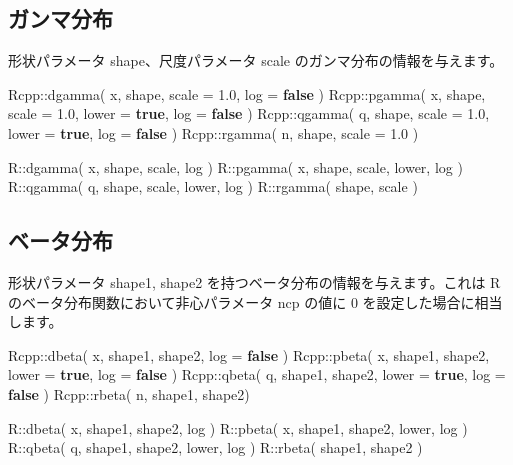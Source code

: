 \documentclass[]{book}
\newenvironment{Shaded}{\begin{snugshade}}{\end{snugshade}}
\newcommand{\FloatTok}[1]{\textcolor[rgb]{0.00,0.00,0.81}{#1}}
\newcommand{\KeywordTok}[1]{\textcolor[rgb]{0.13,0.29,0.53}{\textbf{#1}}}
\newcommand{\NormalTok}[1]{#1}
\begin{document}
\subsection{ガンマ分布}

形状パラメータ shape、尺度パラメータ scale のガンマ分布の情報を与えます。

\begin{Shaded}
\begin{Highlighting}[]
\NormalTok{Rcpp::dgamma( x, shape, scale = }\FloatTok{1.0}\NormalTok{,               log = }\KeywordTok{false}\NormalTok{ )}
\NormalTok{Rcpp::pgamma( x, shape, scale = }\FloatTok{1.0}\NormalTok{, lower = }\KeywordTok{true}\NormalTok{, log = }\KeywordTok{false}\NormalTok{ )}
\NormalTok{Rcpp::qgamma( q, shape, scale = }\FloatTok{1.0}\NormalTok{, lower = }\KeywordTok{true}\NormalTok{, log = }\KeywordTok{false}\NormalTok{ )}
\NormalTok{Rcpp::rgamma( n, shape, scale = }\FloatTok{1.0}\NormalTok{ )}

\NormalTok{R::dgamma( x, shape, scale, log )}
\NormalTok{R::pgamma( x, shape, scale, lower, log )}
\NormalTok{R::qgamma( q, shape, scale, lower, log )}
\NormalTok{R::rgamma(    shape, scale )}
\end{Highlighting}
\end{Shaded}

\subsection{ベータ分布}

形状パラメータ shape1, shape2 を持つベータ分布の情報を与えます。これは R のベータ分布関数において非心パラメータ ncp の値に 0 を設定した場合に相当します。

\begin{Shaded}
\begin{Highlighting}[]
\NormalTok{Rcpp::dbeta( x, shape1, shape2, log = }\KeywordTok{false}\NormalTok{ )}
\NormalTok{Rcpp::pbeta( x, shape1, shape2, lower = }\KeywordTok{true}\NormalTok{, log = }\KeywordTok{false}\NormalTok{ )}
\NormalTok{Rcpp::qbeta( q, shape1, shape2, lower = }\KeywordTok{true}\NormalTok{, log = }\KeywordTok{false}\NormalTok{ )}
\NormalTok{Rcpp::rbeta( n, shape1, shape2)}

\NormalTok{R::dbeta( x, shape1, shape2,        log )}
\NormalTok{R::pbeta( x, shape1, shape2, lower, log )}
\NormalTok{R::qbeta( q, shape1, shape2, lower, log )}
\NormalTok{R::rbeta(    shape1, shape2 )}
\end{Highlighting}
\end{Shaded}
\end{document}
